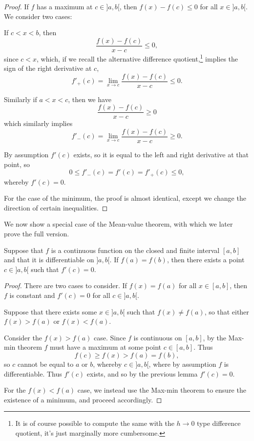 \begin{proof}
	If $f$ has a maximum at $c \in {]{a, b}[}$, then $f(x) - f(c) \leq 0$ for all $x \in {]{a, b}[}$.
	We consider two cases:

	 If $c < x < b$, then
	\[
		\frac{f(x) - f(c)}{x - c} \leq 0,
	\]
	since $c < x$, which, if we recall the alternative difference quotient,\footnote{It is of course possible to compute the same with the $h \to 0$ type difference quotient, it's just marginally more cumbersome.} implies the sign of the right derivative at $c$,
	\[
		f'_+(c) = \lim_{x \to c} \frac{f(x) - f(c)}{x - c} \leq 0.
	\]

	\noindent
	 Similarly if $a < x < c$, then we have
	\[
		\frac{f(x) - f(c)}{x - c} \geq 0
	\]
	which similarly implies
	\[
		f'_-(c) = \lim_{x \to c} \frac{f(x) - f(c)}{x - c} \geq 0.
	\]

	\noindent
	By assumption $f'(c)$ exists, so it is equal to the left and right derivative at that point, so
	\[
		0 \leq f'_-(c) = f'(c) = f'_+(c) \leq 0,
	\]
	whereby $f'(c) = 0$.

	For the case of the minimum, the proof is almost identical, except we change the direction of certain inequalities.
\end{proof}

\noindent
We now show a special case of the Mean-value theorem, with which we later prove the full version.

\begin{theorem}
	Suppose that $f$ is a continuous function on the closed and finite interval $[a, b]$ and that it is differentiable on ${]{a, b}[}$.
	If $f(a) = f(b)$, then there exists a point $c \in {]{a, b}[}$ such that $f'(c) = 0$.
\end{theorem}

\begin{proof}
	There are two cases to consider.
	If $f(x) = f(a)$ for all $x \in [a, b]$, then $f$ is constant and $f'(c) = 0$ for all $c \in {]{a, b}[}$.

	Suppose that there exists some $x \in {]{a, b}[}$ such that $f(x) \neq f(a)$, so that either $f(x) > f(a)$ or $f(x) < f(a)$.

	Consider the $f(x) > f(a)$ case.
	Since $f$ is continuous on $[a, b]$, by the Max-min theorem $f$ must have a maximum at some point $c \in [a, b]$.
	Thus
	\[
		f(c) \geq f(x) > f(a) = f(b),
	\]
	so $c$ cannot be equal to $a$ or $b$, whereby $c \in {]{a, b}[}$, where by assumption $f$ is differentiable.
	Thus $f'(c)$ exists, and so by the previous lemma $f'(c) = 0$.

	For the $f(x) < f(a)$ case, we instead use the Max-min theorem to ensure the existence of a minimum, and proceed accordingly.
\end{proof}

